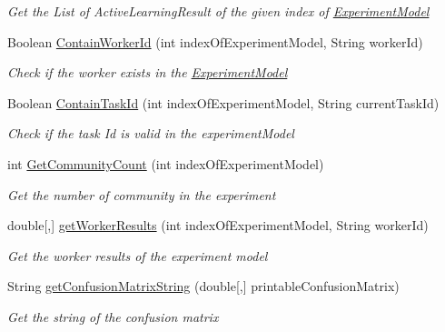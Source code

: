 \begin{DoxyCompactItemize}
\begin{DoxyCompactList}\small\item\em Get the List of Active\+Learning\+Result of the given index of \hyperlink{class_acrive_crowd_g_u_i_1_1_experiment_model}{Experiment\+Model} \end{DoxyCompactList}\item 
Boolean \hyperlink{class_acrive_crowd_g_u_i_1_1_experiment_setting_a4fcbe7fe5a3205826f93c35a4e1f9d82}{Contain\+Worker\+Id} (int index\+Of\+Experiment\+Model, String worker\+Id)
\begin{DoxyCompactList}\small\item\em Check if the worker exists in the \hyperlink{class_acrive_crowd_g_u_i_1_1_experiment_model}{Experiment\+Model} \end{DoxyCompactList}\item 
Boolean \hyperlink{class_acrive_crowd_g_u_i_1_1_experiment_setting_a7a9a2811c0b346a520a87cc8c6a2938b}{Contain\+Task\+Id} (int index\+Of\+Experiment\+Model, String current\+Task\+Id)
\begin{DoxyCompactList}\small\item\em Check if the task Id is valid in the experiment\+Model \end{DoxyCompactList}\item 
int \hyperlink{class_acrive_crowd_g_u_i_1_1_experiment_setting_a78c8c525d992fa01d50dc04653ac0358}{Get\+Community\+Count} (int index\+Of\+Experiment\+Model)
\begin{DoxyCompactList}\small\item\em Get the number of community in the experiment \end{DoxyCompactList}\item 
double\mbox{[},\mbox{]} \hyperlink{class_acrive_crowd_g_u_i_1_1_experiment_setting_ac5e8b7b04857e820714dd8c8fa6b41c6}{get\+Worker\+Results} (int index\+Of\+Experiment\+Model, String worker\+Id)
\begin{DoxyCompactList}\small\item\em Get the worker results of the experiment model \end{DoxyCompactList}\item 
String \hyperlink{class_acrive_crowd_g_u_i_1_1_experiment_setting_ac811eb0367b4edd141ac18b58b7b9310}{get\+Confusion\+Matrix\+String} (double\mbox{[},\mbox{]} printable\+Confusion\+Matrix)
\begin{DoxyCompactList}\small\item\em Get the string of the confusion matrix \end{DoxyCompactList}\item 

\end{DoxyCompactItemize}
